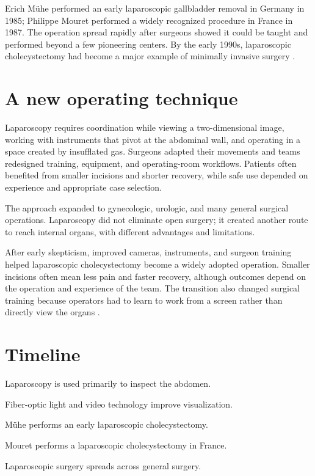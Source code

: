 \documentclass[12pt,oneside]{book}
\begin{document}
Erich Mühe performed an early laparoscopic gallbladder removal in Germany in
1985; Philippe Mouret performed a widely recognized procedure in France in
1987. The operation spread rapidly after surgeons showed it could be taught
and performed beyond a few pioneering centers. By the early 1990s,
laparoscopic cholecystectomy had become a major example of minimally invasive
surgery \cite{laparoscopyHistory}.

\section{A new operating technique}
Laparoscopy requires coordination while viewing a two-dimensional image, working with instruments that pivot at the abdominal wall, and operating in a space created by insufflated gas. Surgeons adapted their movements and teams redesigned training, equipment, and operating-room workflows. Patients often benefited from smaller incisions and shorter recovery, while safe use depended on experience and appropriate case selection.

The approach expanded to gynecologic, urologic, and many general surgical
operations. Laparoscopy did not eliminate open surgery; it created another
route to reach internal organs, with different advantages and limitations.

After early skepticism, improved cameras, instruments, and surgeon training
helped laparoscopic cholecystectomy become a widely adopted operation. Smaller
incisions often mean less pain and faster recovery, although outcomes depend
on the operation and experience of the team. The transition also changed
surgical training because operators had to learn to work from a screen rather
than directly view the organs \cite{laparoscopyHistory}.

\section*{Timeline}
\begin{description}[leftmargin=2.3cm,style=nextline]
  \item[Early 1900s] Laparoscopy is used primarily to inspect the abdomen.
  \item[1950s--1970s] Fiber-optic light and video technology improve visualization.
  \item[1985] Mühe performs an early laparoscopic cholecystectomy.
  \item[1987] Mouret performs a laparoscopic cholecystectomy in France.
  \item[1990s] Laparoscopic surgery spreads across general surgery.
\end{description}
\end{document}
